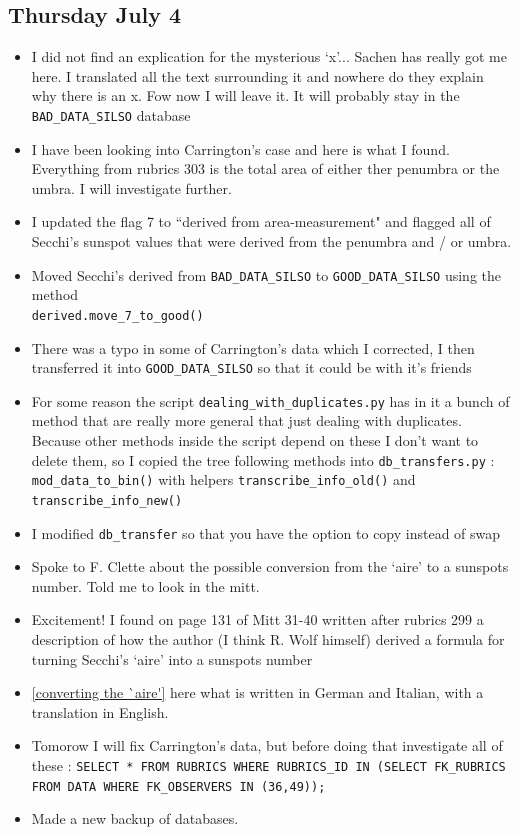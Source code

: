 \documentclass[12pt]{article}
\begin{document}
\subsection{Thursday July 4}
\begin{itemize}
    \item I did not find an explication for the mysterious `x'... Sachen has really got me here. I translated all the text surrounding it and nowhere do they explain why there is an x. Fow now I will leave it. It will probably stay in the \texttt{BAD\_DATA\_SILSO} database
    \item I have been looking into Carrington's case and here is what I found. Everything from rubrics 303 is the total area of either ther penumbra or the umbra. I will investigate further.
    \item I updated the flag 7 to ``derived from area-measurement" and flagged all of Secchi's sunspot values that were derived from the penumbra and / or umbra.
    \item Moved Secchi's derived from \texttt{BAD\_DATA\_SILSO} to \texttt{GOOD\_DATA\_SILSO} using the method \\\texttt{derived.move\_7\_to\_good()}
    \item There was a typo in some of Carrington's data which I corrected, I then transferred it into \texttt{GOOD\_DATA\_SILSO} so that it could be with it's friends
    \item For some reason the script \texttt{dealing\_with\_duplicates.py} has in it a bunch of method that are really more general that just dealing with duplicates. Because other methods inside the script depend on these I don't want to delete them, so I copied the tree following methods into \texttt{db\_transfers.py} : \texttt{mod\_data\_to\_bin()} with helpers \texttt{transcribe\_info\_old()} and \texttt{transcribe\_info\_new()}
    \item I modified \texttt{db\_transfer} so that you have the option to copy instead of swap
    \item Spoke to F. Clette about the possible conversion from the `aire' to a sunspots number. Told me to look in the mitt.
    \item Excitement! I found on page 131 of Mitt 31-40 written after rubrics 299 a description of how the author (I think R. Wolf himself) derived a formula for turning Secchi's `aire' into a sunspots number
    \item \ref{converting the `aire'} here what is written in German and Italian, with a translation in English.
    \item Tomorow I will fix Carrington's data, but before doing that investigate all of these : \texttt{SELECT * FROM RUBRICS WHERE RUBRICS\_ID IN (SELECT FK\_RUBRICS FROM DATA WHERE FK\_OBSERVERS IN (36,49));}
    \item Made a new backup of databases.
\end{itemize}
        
\end{document}
